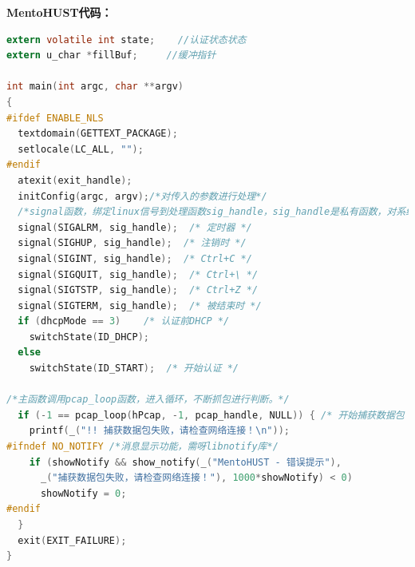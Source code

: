 \documentclass{itecreport-zh}
\begin{document}
\textbf{MentoHUST代码：}\cite{MentoHUSTsrc}
\begin{lstlisting}[language=C]
extern volatile int state;    //认证状态状态
extern u_char *fillBuf;     //缓冲指针

int main(int argc, char **argv)
{
#ifdef ENABLE_NLS
  textdomain(GETTEXT_PACKAGE);
  setlocale(LC_ALL, "");
#endif
  atexit(exit_handle);
  initConfig(argc, argv);/*对传入的参数进行处理*/
  /*signal函数，绑定linux信号到处理函数sig_handle，sig_handle是私有函数，对系统信号进行处理。*/
  signal(SIGALRM, sig_handle);  /* 定时器 */
  signal(SIGHUP, sig_handle);  /* 注销时 */
  signal(SIGINT, sig_handle);  /* Ctrl+C */
  signal(SIGQUIT, sig_handle);  /* Ctrl+\ */
  signal(SIGTSTP, sig_handle);  /* Ctrl+Z */
  signal(SIGTERM, sig_handle);  /* 被结束时 */
  if (dhcpMode == 3)    /* 认证前DHCP */
    switchState(ID_DHCP);
  else
    switchState(ID_START);  /* 开始认证 */

/*主函数调用pcap_loop函数，进入循环，不断抓包进行判断。*/
  if (-1 == pcap_loop(hPcap, -1, pcap_handle, NULL)) { /* 开始捕获数据包 */
    printf(_("!! 捕获数据包失败，请检查网络连接！\n"));
#ifndef NO_NOTIFY /*消息显示功能，需呀libnotify库*/
    if (showNotify && show_notify(_("MentoHUST - 错误提示"),
      _("捕获数据包失败，请检查网络连接！"), 1000*showNotify) < 0)
      showNotify = 0;
#endif
  }
  exit(EXIT_FAILURE);
}


\end{lstlisting}
\end{document}
